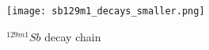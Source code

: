 \documentclass[jon_ringuette_thesis_proposal.tex]{subfiles}
\begin{document}
    \begin{figure}[H]
        \begin{center}
            \texttt{[image: sb129m1\_decays\_smaller.png]}
        \end{center}
        \caption{$^{129m1}Sb$ decay chain}
        \label{fig:sb129m1_decays}
    \end{figure}

\end{document}
